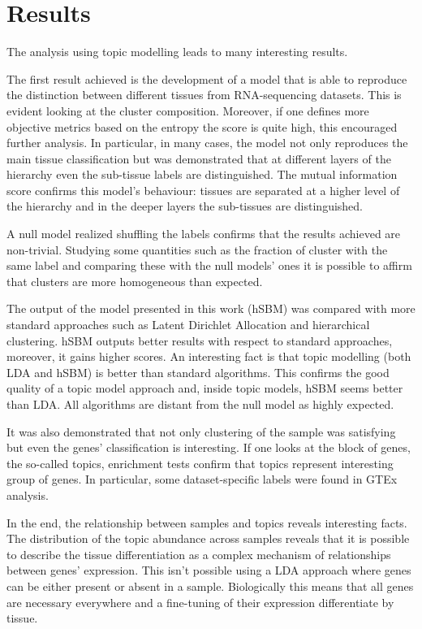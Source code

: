 \section{Results}\label{sec:topic/results}
The analysis using topic modelling leads to many interesting results.

The first result achieved is the development of a model that is able to reproduce the distinction between different tissues from RNA-sequencing datasets. This is evident looking at the cluster composition. Moreover, if one defines more objective metrics based on the entropy the score is quite high, this encouraged further analysis. In particular, in many cases, the model not only reproduces the main tissue classification but was demonstrated that at different layers of the hierarchy even the sub-tissue labels are distinguished. The mutual information score confirms this model's behaviour: tissues are separated at a higher level of the hierarchy and in the deeper layers the sub-tissues are distinguished.

A null model realized shuffling the labels confirms that the results achieved are non-trivial. Studying some quantities such as the fraction of cluster with the same label and comparing these with the null models' ones it is possible to affirm that clusters are more homogeneous than expected.

The output of the model presented in this work (hSBM) was compared with more standard approaches such as Latent Dirichlet Allocation and hierarchical clustering. hSBM outputs better results with respect to standard approaches, moreover, it gains higher scores. An interesting fact is that topic modelling (both LDA and hSBM) is better than standard algorithms. This confirms the good quality of a topic model approach and, inside topic models, hSBM seems better than LDA. All algorithms are distant from the null model as highly expected.

It was also demonstrated that not only clustering of the sample was satisfying but even the genes' classification is interesting. If one looks at the block of genes, the so-called topics, enrichment tests confirm that topics represent interesting group of genes. In particular, some dataset-specific labels were found in GTEx analysis.

In the end, the relationship between samples and topics reveals interesting facts. The distribution of the topic abundance across samples reveals that it is possible to describe the tissue differentiation as a complex mechanism of relationships between genes' expression. This isn't possible using a LDA approach where genes can be either present or absent in a sample. Biologically this means that all genes are necessary everywhere and a fine-tuning of their expression differentiate by tissue.

